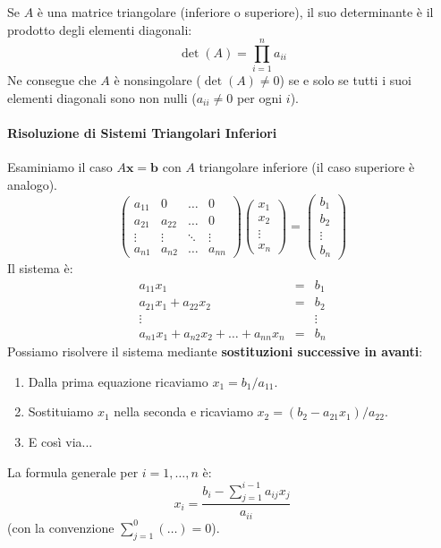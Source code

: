 \begin{teorema}
Se $A$ è una matrice triangolare (inferiore o superiore), il suo determinante è il prodotto degli elementi diagonali:
$$ \det(A) = \prod_{i=1}^n a_{ii} $$
Ne consegue che $A$ è nonsingolare ($\det(A) \neq 0$) se e solo se tutti i suoi elementi diagonali sono non nulli ($a_{ii} \neq 0$ per ogni $i$).
\end{teorema}

\paragraph{Risoluzione di Sistemi Triangolari Inferiori}
Esaminiamo il caso $A\mathbf{x} = \mathbf{b}$ con $A$ triangolare inferiore (il caso superiore è analogo).
\[
\begin{pmatrix}
    a_{11} & 0 & \dots & 0 \\
    a_{21} & a_{22} & \dots & 0 \\
    \vdots & \vdots & \ddots & \vdots \\
    a_{n1} & a_{n2} & \dots & a_{nn}
\end{pmatrix}
\begin{pmatrix} x_1 \\ x_2 \\ \vdots \\ x_n \end{pmatrix} = 
\begin{pmatrix} b_1 \\ b_2 \\ \vdots \\ b_n \end{pmatrix}
\]
Il sistema è:
\[
\begin{array}{lcr}
a_{11}x_1 & = & b_1 \\
a_{21}x_1 + a_{22}x_2 & = & b_2 \\
\vdots & & \vdots \\
a_{n1}x_1 + a_{n2}x_2 + \dots + a_{nn}x_n & = & b_n
\end{array}
\]
Possiamo risolvere il sistema mediante \textbf{sostituzioni successive in avanti}:
\begin{enumerate}
    \item Dalla prima equazione ricaviamo $x_1 = b_1 / a_{11}$.
    \item Sostituiamo $x_1$ nella seconda e ricaviamo $x_2 = (b_2 - a_{21}x_1) / a_{22}$.
    \item E così via...
\end{enumerate}
La formula generale per $i=1, \dots, n$ è:
\begin{equation} \label{eq:sost_avanti}
    x_i = \frac{b_i - \sum_{j=1}^{i-1} a_{ij}x_j}{a_{ii}}
\end{equation}
(con la convenzione $\sum_{j=1}^0 (\dots) = 0$).


